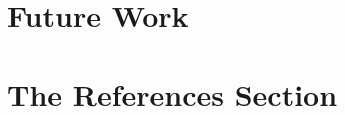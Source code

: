 \documentclass[runningheads,a4paper]{llncs}
\begin{document}

\section{Future Work}


\section{The References Section}\label{references}

\end{document}
